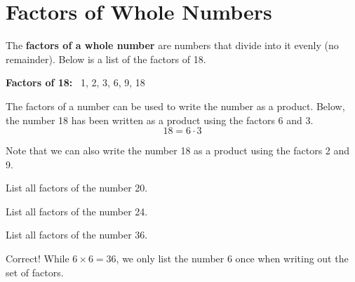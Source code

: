 \documentclass{ximera}[font=12pt]  %
\begin{document}
\section*{Factors of Whole Numbers}

The \textbf{factors of a whole number} are numbers that divide into it evenly (no remainder).  Below is a list of the factors of 18.

\begin{center}
    \textbf{Factors of 18:} \ 1, 2, 3, 6, 9, 18
\end{center}

The factors of a number can be used to write the number as a product.  Below, the number 18 has been written as a product using the factors 6 and 3.
\[ 18 =  6 \cdot 3 \]

Note that we can also write the number 18 as a product using the factors 2 and 9.

\begin{problem}
List all factors of the number 20.

\begin{multipleChoice}
\end{multipleChoice}

\end{problem}

\begin{problem}
List all factors of the number 24.
\begin{multipleChoice}
\end{multipleChoice}
\end{problem}


\begin{problem}
List all factors of the number 36.
\begin{multipleChoice}
\end{multipleChoice}
\begin{feedback}
    Correct! While $6 \times 6 = 36$, we only list the number 6 once when writing out the set of factors.
\end{feedback}
\end{problem}
\end{document}
